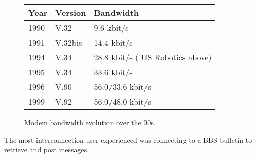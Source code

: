  \begin{figure}[H]
\centering  
\begin{tabularx}{\textwidth}{ L{0.2} L{0.3} L{0.5}}
  \toprule
  \textbf{Year} & \textbf{Version} & \textbf{Bandwidth} \\
  \toprule 
   
    1990 & V.32	& 9.6 kbit/s \\
    1991 & V.32bis &	14.4 kbit/s \\
    1994 & V.34 &	28.8 kbit/s  ( US Robotics above) \\
    1995 & V.34 &	33.6 kbit/s \\
    1996 & V.90 &	56.0/33.6 kbit/s\\
    1999 & V.92 &	56.0/48.0 kbit/s\\
   
   \toprule
\end{tabularx}
\caption{Modem bandwidth evolution over the 90s.}
\end{figure}



\par
{}
The most interconnection user experienced was connecting to a BBS bulletin to retrieve and post messages. 

